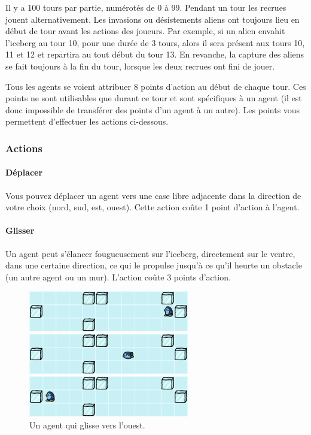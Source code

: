 Il y a 100 tours par partie, numérotés de 0 à 99. Pendant un tour les
recrues jouent alternativement. Les invasions ou désistements aliens ont
toujours lieu en début de tour avant les actions des joueurs. Par
exemple, si un alien envahit l'iceberg au tour 10, pour une durée de 3
tours, alors il sera présent aux tours 10, 11 et 12 et repartira au tout
début du tour 13. En revanche, la capture des aliens se fait toujours à
la fin du tour, lorsque les deux recrues ont fini de jouer.

Tous les agents se voient attribuer 8 points d'action au début de chaque
tour. Ces points ne sont utilisables que durant ce tour et sont
spécifiques à un agent (il est donc impossible de transférer des points
d'un agent à un autre). Les points vous permettent d'effectuer les
actions ci-dessous.

\subsubsection{Actions}\label{actions}

\paragraph{Déplacer}\label{duxe9placer}

Vous pouvez déplacer un agent vers une case libre adjacente dans la
direction de votre choix (nord, sud, est, ouest). Cette action coûte 1
point d'action à l'agent.

\paragraph{Glisser}\label{glisser}

Un agent peut s'élancer fougueusement sur l'iceberg, directement sur le
ventre, dans une certaine direction, ce qui le propulse jusqu'à ce qu'il
heurte un obstacle (un autre agent ou un mur). L'action coûte 3 points
d'action.

\begin{figure}[!h]
    \centering
    \includegraphics[width=7cm]{img/slide1}

    \vspace{0.5cm}
    \includegraphics[width=7cm]{img/slide2}

    \vspace{0.5cm}
    \includegraphics[width=7cm]{img/slide3}

    \caption*{Un agent qui glisse vers l'ouest.}
\end{figure}

